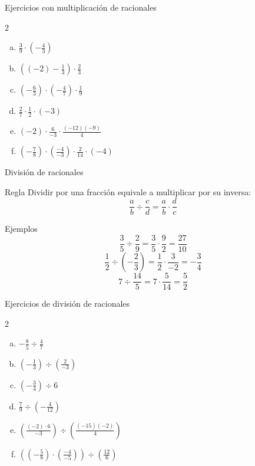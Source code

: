 \documentclass[handout,aspectratio=169,10pt]{beamer}
\begin{document}
	\begin{frame}{Ejercicios con multiplicación de racionales}
		\begin{multicols}{2}
			\begin{enumerate}[a)]
				\item \(\frac39\cdot\left(-\frac43\right)\)
				\item \(\left((-2)-\frac13\right)\cdot\frac23\)
				\item \(\left(-\frac63\right)\cdot\left(-\frac47\right)\cdot\frac19\)
				\item \(\frac27\cdot\frac12\cdot(-3)\)
				\item \((-2)\cdot\frac6{-3}\cdot\frac{(-12)(-9)}4\)
				\item \(\left(-\frac78\right)\cdot\left(\frac{-4}{-3}\right)\cdot\frac{2}{14}\cdot(-4)\)
			\end{enumerate}
		\end{multicols}
	\end{frame}
	
	\begin{frame}{División de racionales}
		\begin{block}{Regla}
			Dividir por una fracción equivale a multiplicar por su inversa:
			\[
			\frac{a}{b}\div\frac{c}{d}=\frac{a}{b}\cdot\frac{d}{c}
			\]
		\end{block}
		
		\begin{exampleblock}{Ejemplos}
			\[
			\frac35\div\frac29=\frac35\cdot\frac92=\frac{27}{10}
			\]
			\[
			\frac12\div\left(-\frac23\right)=\frac12\cdot\frac3{-2}=-\frac34
			\]
			\[
			7\div\frac{14}{5}=7\cdot\frac5{14}=\frac52
			\]
		\end{exampleblock}
	\end{frame}
	
	\begin{frame}{Ejercicios de división de racionales}
		\begin{multicols}{2}
			\begin{enumerate}[a)]
				\item \(-\frac85\div\frac47\)
				\item \(\left(-\frac13\right)\div\left(\frac2{-3}\right)\)
				\item \(\left(-\frac34\right)\div 6\)
				\item \(\frac79\div\left(-\frac4{12}\right)\)
				\item \(\left(\frac{(-2)\cdot 6}{-3}\right)\div\left(\frac{(-15)(-2)}4\right)\)
				\item \(\left(\left(-\frac58\right)\cdot\left(\frac{-4}{-5}\right)\right)\div\left(\frac{12}{6}\right)\)
			\end{enumerate}
		\end{multicols}
	\end{frame}
	
\end{document}
